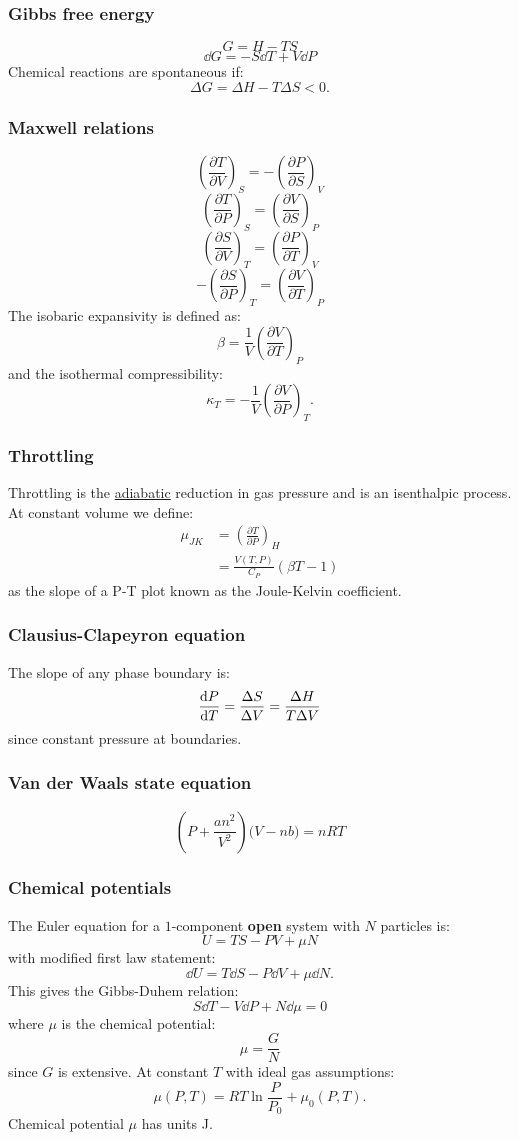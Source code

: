 \documentclass{article}
\begin{document}
\begin{multicols*}{3}
\subsubsection*{Gibbs free energy}
$$G=H-TS$$
$$\dd G=-S\dd T+V\dd P$$
Chemical reactions are spontaneous if:
$$\Delta G=\Delta H-T\Delta S<0.$$

\subsubsection*{Maxwell relations}
$$\left(\frac{\partial T}{\partial V}\right)_S
=-\left(\frac{\partial P}{\partial S}\right)_V$$
$$\left(\frac{\partial T}{\partial P}\right)_S
=\left(\frac{\partial V}{\partial S}\right)_P$$
$$\left(\frac{\partial S}{\partial V}\right)_T
=\left(\frac{\partial P}{\partial T}\right)_V$$
$$-\left(\frac{\partial S}{\partial P}\right)_T
=\left(\frac{\partial V}{\partial T}\right)_P$$
The isobaric expansivity is defined as:
$$\beta=\frac{1}{V}
\left(\frac{\partial V}{\partial T}\right)_P$$
and the isothermal compressibility:
$$\kappa_T=-\frac{1}{V}
\left(\frac{\partial V}{\partial P}\right)_T.$$

\subsubsection*{Throttling}
Throttling is the \underline{adiabatic} 
reduction in gas pressure
and is an isenthalpic process.
At constant volume we define:
\begin{align*}
    \mu_{JK}&=\left(
    \frac{\partial T}{\partial P}\right)_H \\
    &=\frac{V(T,P)}{C_P}(\beta T-1)
\end{align*}
as the slope of a P-T plot
known as the
Joule-Kelvin coefficient.

\subsubsection*{Clausius-Clapeyron equation}
The slope of any phase boundary is:
$$\dv{P}{T}=\frac{\Delta S}{\Delta V}
=\frac{\Delta H}{T\Delta V}$$
since constant pressure at boundaries.

\subsubsection*{Van der Waals state equation}
$$\left(P+\frac{an^2}{V^2}\right)
\bigl(V-nb\bigr)=nRT$$

\subsubsection*{Chemical potentials}
The Euler equation for a $1$-component
\textbf{open} system with
$N$ particles is:
$$U=TS-PV+\mu N$$
with modified first law statement: 
$$\dd U
=T\dd S-P\dd V+\mu\dd N.$$
This gives the Gibbs-Duhem relation:
$$S\dd T-V\dd P+N\dd\mu=0$$
where $\mu$ is the chemical potential:
$$\mu=\frac{G}{N}$$
since $G$ is extensive. At constant $T$
with ideal gas assumptions:
$$\mu(P,T)=RT\ln\frac{P}{P_0}+\mu_0(P,T).$$
Chemical potential $\mu$ has units J.


\end{multicols*}
\end{document}
